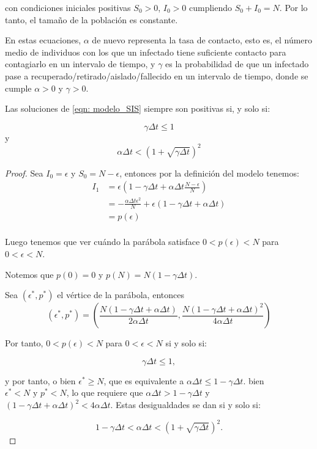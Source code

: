 con condiciones iniciales positivas $S_0>0$, $I_0>0$ cumpliendo $S_0+I_0=N$. Por lo tanto, el tamaño de la población es constante.

En estas ecuaciones, $\alpha$ de nuevo representa la tasa de contacto, esto es, el número medio de individuos con los que un infectado tiene suficiente contacto para contagiarlo en un intervalo de tiempo, y $\gamma$ es la probabilidad de que un infectado pase a recuperado/retirado/aislado/fallecido en un intervalo de tiempo, donde se cumple $\alpha >0$ y $\gamma >0$.

\begin{proposition}
Las soluciones de \eqref{eqn: modelo_SIS} siempre son positivas si, y solo si:

$$\gamma \Delta t \leq 1 $$ y $$\alpha\Delta t< \left( 1+\sqrt{\gamma \Delta t} \right)^2$$

\end{proposition}
\begin{proof}
Sea $I_0=\epsilon$ y $S_0=N-\epsilon$, entonces por la definición del modelo tenemos:
\begin{equation}
\begin{aligned}
I_1 & =\epsilon\left(1-\gamma\Delta t+\alpha\Delta t\frac{N-\epsilon}{N}\right) \\
& = -\frac{\alpha\Delta t \epsilon^2}{N} + \epsilon(1-\gamma\Delta t+\alpha\Delta t ) \\
& = p(\epsilon) \\
\end{aligned}
\end{equation}

Luego tenemos que ver cuándo la parábola satisface $0<p(\epsilon)<N$ para $0<\epsilon<N$.

Notemos que $p(0)=0$ y $p(N)=N(1-\gamma\Delta t).$

Sea $(\epsilon^*, p^*)$ el vértice de la parábola, entonces 
$$(\epsilon^*, p^*) = \left(\frac{N(1-\gamma\Delta t+\alpha\Delta t)}{2\alpha\Delta t}, \frac{N(1-\gamma\Delta t+\alpha\Delta t)^2}{4\alpha\Delta t}\right)$$

Por tanto, $0<p(\epsilon )<N$ para $0<\epsilon <N$ si y solo si:

$$\gamma\Delta t \leq 1,$$

y por tanto, o bien $\epsilon^* \geq N$, que es equivalente a $\alpha\Delta t \leq 1-\gamma\Delta t$. bien $\epsilon^*<N \text{  y  } p^*<N$, lo que requiere que $\alpha\Delta t > 1-\gamma\Delta t$ y $(1-\gamma\Delta t+\alpha\Delta t)^2<4\alpha\Delta t$. Estas desigualdades se dan si y solo si:

$$1-\gamma\Delta t < \alpha \Delta t < \left( 1+\sqrt{\gamma \Delta t} \right)^2.$$

\end{proof}

